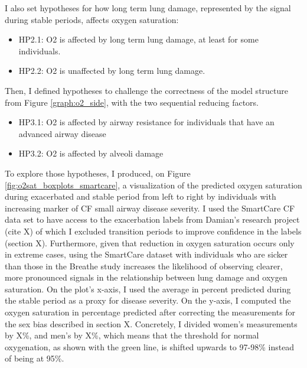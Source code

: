 I also set hypotheses for how long term lung damage, represented by the signal during stable periods, affects oxygen saturation:
\begin{itemize}
    \item HP2.1: O2 is affected by long term lung damage, at least for some individuals.
    \item HP2.2: O2 is unaffected by long term lung damage.
\end{itemize}

Then, I defined hypotheses to challenge the correctness of the model structure from Figure \ref{graph:o2_side}, with the two sequential reducing factors.
\begin{itemize}
    \item HP3.1: O2 is affected by airway resistance for individuals that have an advanced airway disease
    \item HP3.2: O2 is affected by alveoli damage
\end{itemize}

To explore those hypotheses, I produced, on Figure \ref{fig:o2sat_boxplots_smartcare}, a visualization of the predicted oxygen saturation during exacerbated and stable period from left to right by individuals with increasing marker of CF small airway disease severity. I used the SmartCare CF data set to have access to the exacerbation labels from Damian’s research project (cite X) of which I excluded transition periods to improve confidence in the labels (section X). Furthermore, given that reduction in oxygen saturation occurs only in extreme cases, using the SmartCare dataset with individuals who are sicker than those in the Breathe study increases the likelihood of observing clearer, more pronounced signals in the relationship between lung damage and oxygen saturation. On the plot's x-axis, I used the average \F in percent predicted during the stable period as a proxy for disease severity. On the y-axis, I computed the oxygen saturation in percentage predicted after correcting the measurements for the sex bias described in section X. Concretely, I divided women's measurements by X\%, and men's by X\%, which means that the threshold for normal oxygenation, as shown with the green line, is shifted upwards to 97-98\% instead of being at 95\%.

